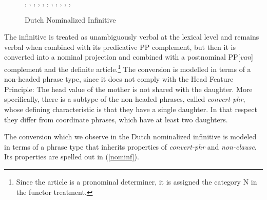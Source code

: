 \documentclass[output=paper]{langsci/langscibook}
\begin{document}
\begin{figure}
\begin{center}
\footnotesize
\tree
{,
  {,
    {}},
  {,
    {,
      {,
        {,
          {}},
        {,
          {}}}},
    {, 
      {}}}}
\caption{\label{kust} Dutch Nominalized Infinitive }
\normalsize
\end{center}
\end{figure}    

The infinitive is treated as unambiguously verbal at the lexical level and 
remains verbal when combined with its predicative PP complement, but then it  
is converted into a nominal projection and combined with a postnominal PP[{\it van\/}]
complement and the definite article.\footnote{Since the article is a pronominal 
determiner, it is assigned the category N in the functor treatment.}     
The conversion is modelled in terms of a non-headed phrase type, 
since it does not comply with the Head Feature Principle: 
The {\sc head} value of the mother is not shared with the daughter.  
More specifically, there is a subtype of the non-headed phrases, called {\it convert-phr}, 
whose defining characteristic is that they have a single daughter. 
In that respect they differ from coordinate phrases, which have at least two daughters.  

\begin{exe} 
\ex\label{conv} 
\begin{avm} 
\end{avm}
\end{exe}

\noindent
The conversion which we observe in the Dutch nominalized infinitive is modeled 
in terms of a phrase type that inherits properties of {\it convert-phr\/} and 
{\it non-clause}. Its properties are spelled out in (\ref{nominf}). 
\end{document}
